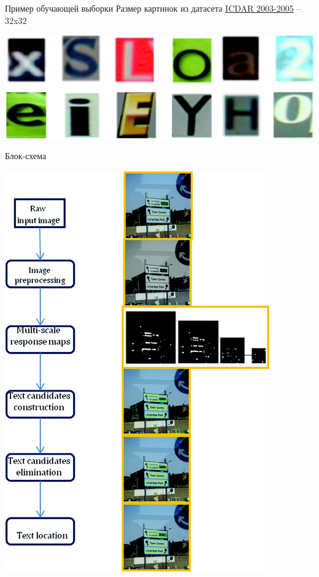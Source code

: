 \documentclass{beamer}
\begin{document}
  \begin{frame}{Пример обучающей выборки}
    Размер картинок из датасета     \href{http://www.iapr-tc11.org/mediawiki/index.php/ICDAR_2003_Robust_Reading_Competitions}{ICDAR 2003-2005} -- 32x32
    \begin{center}
      \includegraphics[scale=0.5]{samples.jpg}
    \end{center}
  \end{frame}

  \begin{frame}{Блок-схема}
    \begin{center}
      \includegraphics[scale=0.35]{flowchart.jpg}
    \end{center}
  \end{frame}
\end{document}
